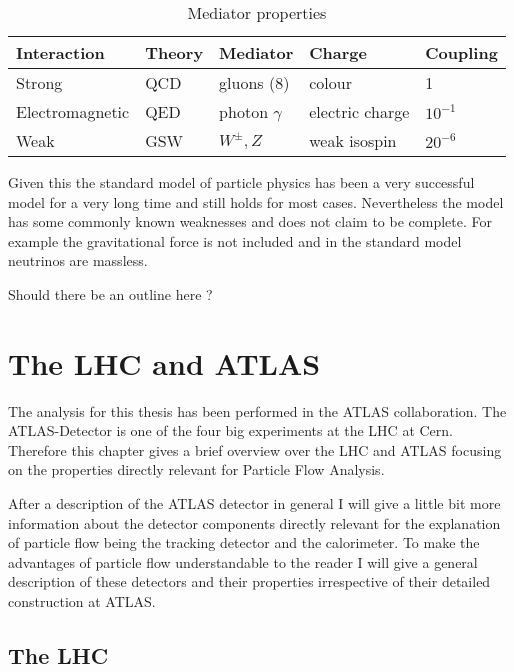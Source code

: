 \begin{table}[]
\centering
\caption{Mediator properties}
\label{mediator properties}
\begin{tabular}{|l|l|l|l|l|}
\hline
Interaction     & Theory & Mediator        & Charge          & Coupling  \\ \hline
Strong          & QCD    & gluons (8)      & colour          & 1         \\ \hline
Electromagnetic & QED    & photon $\gamma$ & electric charge & $10^{-1}$ \\ \hline
Weak            & GSW    & $W^{\pm}, Z$    & weak isospin    & $20^{-6}$ \\ \hline
\end{tabular}
\end{table}

Given this the standard model of particle physics has been a very successful model for a very long time and still holds for most cases.
Nevertheless the model has some commonly known weaknesses and does not claim to be complete. For example the gravitational force is not included and in the standard model neutrinos are massless.

Should there be an outline here ? 
\newpage





\section{The LHC and ATLAS}

The analysis for this thesis has been performed in the ATLAS collaboration. The ATLAS-Detector is one of the four big experiments at the LHC at Cern. Therefore this chapter gives a brief overview over the LHC and ATLAS focusing on the properties directly relevant for Particle Flow Analysis.

After a description of the ATLAS detector in general I will give a little bit more information about the detector components directly relevant for the explanation of particle flow being the tracking detector and the calorimeter. To make the advantages of particle flow understandable to the reader I will give a general description of these detectors and their properties irrespective of their detailed construction at ATLAS.

\subsection{The LHC}

